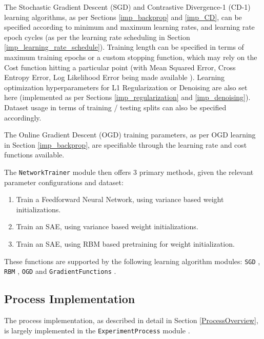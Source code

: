 \documentclass[a4paper,11pt,oneside]{article}
\theoremstyle{plain}
\theoremstyle{definition}
\begin{document}
	The Stochastic Gradient Descent (SGD) and Contrastive Divergence-1 (CD-1) learning algorithms, as per Sections \ref{imp_backprop} and \ref{imp_CD}, can be specified according to minimum and maximum learning rates, and learning rate epoch cycles (as per the learning rate scheduling in Section \ref{imp_learning_rate_schedule}). Training length can be specified in terms of maximum training epochs or a custom stopping function, which may rely on the Cost function hitting a particular point (with Mean Squared Error, Cross Entropy Error, Log Likelihood Error being made available \citep{DCCostFunctions}). Learning optimization hyperparameters for L1 Regularization or Denoising are also set here (implemented as per Sections \ref{imp_regularization} and \ref{imp_denoising}). Dataset usage in terms of training / testing splits can also be specified accordingly.\newline
	
	The Online Gradient Descent (OGD) training parameters, as per OGD learning in Section \ref{imp_backprop}, are specifiable through the learning rate and cost functions available.\newline
	
	The \texttt{NetworkTrainer} module \citep{DCNetworkTrainer} then offers 3 primary methods, given the relevant parameter configurations and dataset:
	
	\begin{enumerate}
		\item Train a Feedforward Neural Network, using variance based weight initializations.
		\item Train an SAE, using variance based weight initializations.
		\item Train an SAE, using RBM based pretraining for weight initialization.
	\end{enumerate}
	
	These functions are supported by the following learning algorithm modules: \texttt{SGD} \citep{DCSGD}, \texttt{RBM} \citep{DCRBM}, \texttt{OGD} \citep{DCOGD} and  \texttt{GradientFunctions} \citep{DCGradientFunctions}.
	
	\subsection{Process Implementation}
	
	The process implementation, as described in detail in Section \ref{ProcessOverview}, is largely implemented in the \texttt{ExperimentProcess} module \citep{DCExperimentProcess}.
	
\end{document}
